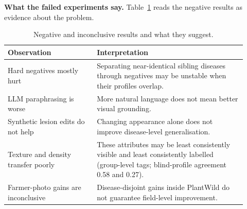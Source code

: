 \documentclass[11pt]{article}
\begin{document}
\textbf{What the failed experiments say.} Table~\ref{tab:failures} reads the negative results as evidence about the problem.
\begin{table}[t]\centering\small
\begin{tabular}{p{0.34\linewidth}p{0.58\linewidth}}\toprule
Observation & Interpretation \\\midrule
Hard negatives mostly hurt & Separating near-identical sibling diseases through negatives may be unstable when their profiles overlap. \\
LLM paraphrasing is worse & More natural language does not mean better visual grounding. \\
Synthetic lesion edits do not help & Changing appearance alone does not improve disease-level generalisation. \\
Texture and density transfer poorly & These attributes may be least consistently visible and least consistently labelled (group-level tags; blind-profile agreement 0.58 and 0.27). \\
Farmer-photo gains are inconclusive & Disease-disjoint gains inside PlantWild do not guarantee field-level improvement. \\\bottomrule
\end{tabular}
\caption{Negative and inconclusive results and what they suggest.}\label{tab:failures}
\end{table}
\end{document}
